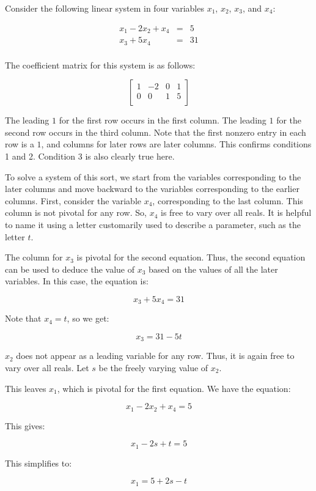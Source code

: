 \documentclass[10pt]{amsart}
\begin{document}
Consider the following linear system in four variables $x_1$, $x_2$, $x_3$, and $x_4$:

\begin{eqnarray*}
  x_1 - 2x_2 + x_4 & = & 5\\
  x_3 + 5x_4 & = & 31\\
\end{eqnarray*}

The coefficient matrix for this system is as follows:

$$\left[\begin{matrix}
1 & -2 & 0 & 1 \\
0 & 0 & 1 & 5 \\
\end{matrix}\right]$$

The leading $1$ for the first row occurs in the first column. The
leading $1$ for the second row occurs in the third column. Note that
the first nonzero entry in each row is a $1$, and columns for later
rows are later columns. This confirms conditions 1 and 2. Condition 3
is also clearly true here.

To solve a system of this sort, we start from the variables
corresponding to the later columns and move backward to the variables
corresponding to the earlier columns. First, consider the variable
$x_4$, corresponding to the last column. This column is not pivotal
for any row. So, $x_4$ is free to vary over all reals. It is helpful
to name it using a letter customarily used to describe a parameter,
such as the letter $t$.

The column for $x_3$ is pivotal for the second equation. Thus, the
second equation can be used to deduce the value of $x_3$ based on the
values of all the later variables. In this case, the equation is:

$$x_3 + 5x_4 = 31$$

Note that $x_4 = t$, so we get:

$$x_3 = 31 - 5t$$

$x_2$ does not appear as a leading variable for any row. Thus, it is
again free to vary over all reals. Let $s$ be the freely varying value
of $x_2$.

This leaves $x_1$, which is pivotal for the first equation. We have the equation:

$$x_1 - 2x_2 + x_4 = 5$$

This gives:

$$x_1 - 2s + t = 5$$

This simplifies to:

$$x_1 = 5 + 2s - t$$
\end{document}
